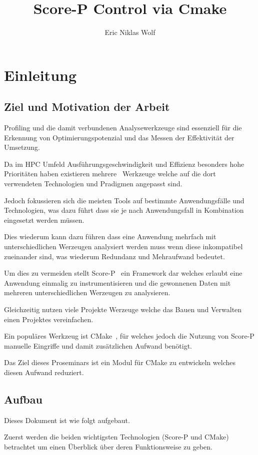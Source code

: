 \documentclass[german,proseminar,hyperref,utf8]{zihpub}
\author{Eric Niklas Wolf}
\title{Score-P Control via Cmake}
\begin{document}
    \section{Einleitung}
    \subsection{Ziel und Motivation der Arbeit}
    Profiling und die damit verbundenen Analysewerkzeuge sind essenziell für die Erkennung von
    Optimierungspotenzial und das Messen der Effektivität der Umsetzung.

    Da im HPC Umfeld Ausführungsgeschwindigkeit und Effizienz besonders hohe Prioritäten haben existieren
    mehrere~ Werkzeuge welche auf die dort verwendeten Technologien
    und Pradigmen angepasst sind.

    Jedoch fokussieren sich die meisten Tools auf bestimmte Anwendungsfälle und Technologien,
    was dazu führt dass sie je nach Anwendungsfall in Kombination eingesetzt werden müssen.

    Dies wiederum kann dazu führen dass eine Anwendung mehrfach mit unterschiedlichen Werzeugen
    analysiert werden muss wenn diese inkompatibel zueinander sind, was wiederum Redundanz
    und Mehraufwand bedeutet.

    Um dies zu vermeiden stellt Score-P~\cite{Score-P-Paper} ein Framework dar welches erlaubt
    eine Anwendung  einmalig zu instrumentisieren und die gewonnenen Daten mit mehreren
    unterschiedlichen Werzeugen zu analysieren.

    Gleichzeitig nutzen viele Projekte Werzeuge welche das Bauen und Verwalten einen Projektes
    vereinfachen.

    Ein populäres Werkzeug ist CMake~\cite{CMake-Documentation}, für welches jedoch die Nutzung
    von Score-P manuelle Eingriffe und damit zusätzlichen Aufwand benötigt.

    Das Ziel dieses Proseminars ist ein Modul für CMake zu entwickeln welches diesen Aufwand
    reduziert.


    \subsection{Aufbau}
    Dieses Dokument ist wie folgt aufgebaut.

    Zuerst werden die beiden wichtigsten Technologien (Score-P und CMake) betrachtet um einen
    Überblick über deren Funktionsweise zu geben.
\end{document}
